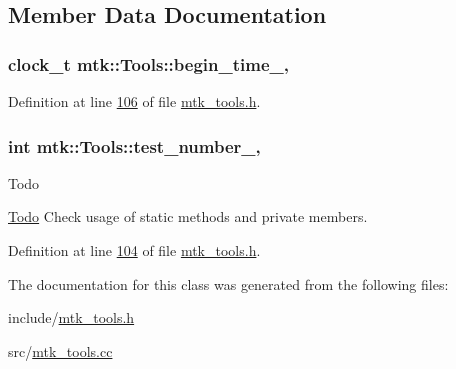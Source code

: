 \subsection{Member Data Documentation}
\hypertarget{classmtk_1_1Tools_a4bd58d08397db42271ed9e2d3ecc9963}{
\subsubsection[{begin\-\_\-time\-\_\-}]{\setlength{\rightskip}{0pt plus 5cm}clock\-\_\-t mtk\-::\-Tools\-::begin\-\_\-time\-\_\-\hspace{0.3cm}{\ttfamily [static]}, {\ttfamily [private]}}}\label{classmtk_1_1Tools_a4bd58d08397db42271ed9e2d3ecc9963}


Definition at line \hyperlink{mtk__tools_8h_source_l00106}{106} of file \hyperlink{mtk__tools_8h_source}{mtk\-\_\-tools.\-h}.

\hypertarget{classmtk_1_1Tools_a04a60458594336ee1badff79b8a9a77f}{
\subsubsection[{test\-\_\-number\-\_\-}]{\setlength{\rightskip}{0pt plus 5cm}int mtk\-::\-Tools\-::test\-\_\-number\-\_\-\hspace{0.3cm}{\ttfamily [static]}, {\ttfamily [private]}}}\label{classmtk_1_1Tools_a04a60458594336ee1badff79b8a9a77f}
\begin{DoxyRefDesc}{Todo}
\item[\hyperlink{todo__todo000020}{Todo}]Check usage of static methods and private members. \end{DoxyRefDesc}


Definition at line \hyperlink{mtk__tools_8h_source_l00104}{104} of file \hyperlink{mtk__tools_8h_source}{mtk\-\_\-tools.\-h}.



The documentation for this class was generated from the following files\-:\begin{DoxyCompactItemize}
\item 
include/\hyperlink{mtk__tools_8h}{mtk\-\_\-tools.\-h}\item 
src/\hyperlink{mtk__tools_8cc}{mtk\-\_\-tools.\-cc}\end{DoxyCompactItemize}
